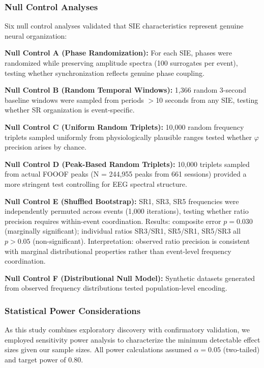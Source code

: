 \documentclass[11pt,a4paper]{article}
\newcommand{\phisym}{\varphi}
\begin{document}
\subsubsection{Null Control Analyses}

Six null control analyses validated that SIE characteristics represent genuine neural organization:

\textbf{Null Control A (Phase Randomization):} For each SIE, phases were randomized while preserving amplitude spectra (100 surrogates per event), testing whether synchronization reflects genuine phase coupling.

\textbf{Null Control B (Random Temporal Windows):} 1,366 random 3-second baseline windows were sampled from periods $>$10 seconds from any SIE, testing whether SR organization is event-specific.

\textbf{Null Control C (Uniform Random Triplets):} 10,000 random frequency triplets sampled uniformly from physiologically plausible ranges tested whether $\phisym$ precision arises by chance.

\textbf{Null Control D (Peak-Based Random Triplets):} 10,000 triplets sampled from actual FOOOF peaks (N = 244,955 peaks from 661 sessions) provided a more stringent test controlling for EEG spectral structure.

\textbf{Null Control E (Shuffled Bootstrap):} SR1, SR3, SR5 frequencies were independently permuted across events (1,000 iterations), testing whether ratio precision requires within-event coordination. Results: composite error $p = 0.030$ (marginally significant); individual ratios SR3/SR1, SR5/SR1, SR5/SR3 all $p > 0.05$ (non-significant). Interpretation: observed ratio precision is consistent with marginal distributional properties rather than event-level frequency coordination.

\textbf{Null Control F (Distributional Null Model):} Synthetic datasets generated from observed frequency distributions tested population-level encoding.

\subsubsection{Statistical Power Considerations}

As this study combines exploratory discovery with confirmatory validation, we employed sensitivity power analysis to characterize the minimum detectable effect sizes given our sample sizes. All power calculations assumed $\alpha = 0.05$ (two-tailed) and target power of 0.80.
\end{document}
